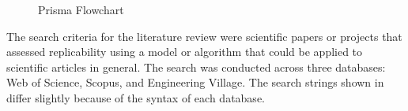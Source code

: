 \documentclass[12pt, a4paper, twocolumn]{article}
\begin{document}
			\begin{figure}[!ht]
				\centering
				\caption[Prisma Flowchart]{Prisma Flowchart} 
				\label{fig:prisma}
			\end{figure}



	The search criteria for the literature review were scientific papers or projects that assessed replicability using a model or algorithm that could be applied to scientific articles in general. The search was conducted across three databases: Web of Science, Scopus, and Engineering Village. The search strings shown in  differ slightly because of the syntax of each database.
\end{document}
